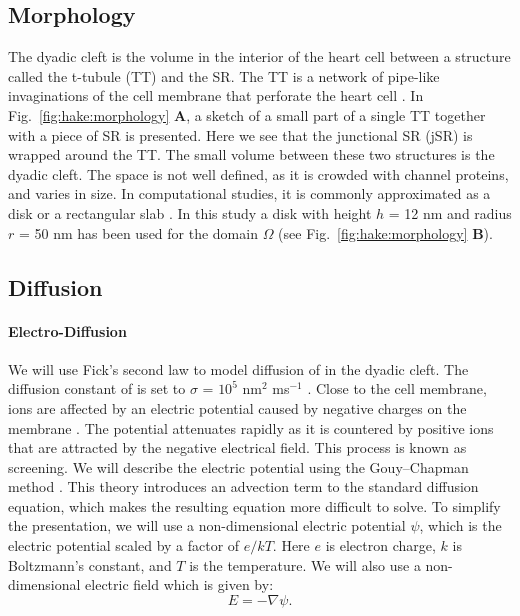 \subsection*{Morphology}
\label{sec:hake:morphology}
  
 The dyadic cleft is the volume in the
interior of the heart cell between a structure called the t-tubule
(TT) and the SR. The TT is a network of pipe-like invaginations of the
cell membrane that perforate the heart cell
\cite{SoellerCannell1999}. In Fig.~\ref{fig:hake:morphology}
\textbf{A}, a sketch of a small part of a single TT together with a
piece of SR is presented. Here we see that the junctional SR (jSR) is
wrapped around the TT. The small volume between these two structures
is the dyadic cleft. The space is not well defined, as it is crowded
with channel proteins, and varies in size. In computational studies,
it is commonly approximated as a disk or a rectangular slab
\cite{PeskoffPostLanger1992,SoellerCannell1997,KohSrinivasanChingEtAl2006,
  TanskanenGreensteinChenEtAl2007}. In this study a disk with height
$h$ = 12 nm and radius $r$ = 50 nm has been used for the domain
$\Omega$ (see Fig.~\ref{fig:hake:morphology} \textbf{B}).\par

\subsection*{\Ca Diffusion}
\label{sec:hake:ca-diffusion}

\paragraph*{Electro-Diffusion}
  
   We will use Fick's second law to model diffusion of \Ca in
the dyadic cleft. The diffusion constant of \Ca is set to $\sigma$ =
$10^5$ nm$^2$ ms$^{-1}$ \cite{LangerPeskoff1996}. Close to the cell
membrane, ions are affected by an electric potential caused by
negative charges on the membrane
\cite{McLaughlinSzaboEisenman1971,LangnerCafisoMarceljaEtAl1990}. The
potential attenuates rapidly as it is countered by positive ions that
are attracted by the negative electrical field. This process is known
as screening. We will describe the electric potential using the
Gouy--Chapman method \cite{Grahame1947}. This theory introduces an
advection term to the standard diffusion equation, which makes the
resulting equation more difficult to solve. To simplify the
presentation, we will use a non-dimensional electric potential $\psi$,
which is the electric potential scaled by a factor of $e/kT$. Here $e$
is electron charge, $k$ is Boltzmann's constant, and $T$ is the
temperature. We will also use a non-dimensional electric field which
is given by:
\begin{equation}
  \label{eq:hake:electric_field}
  E=-\nabla\psi.
\end{equation}

